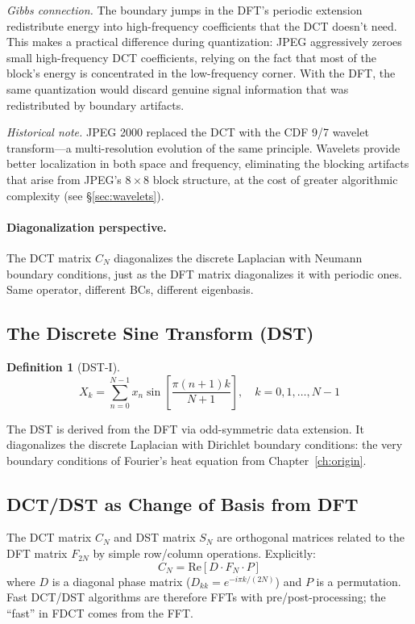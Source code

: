 \documentclass[12pt,a4paper]{report}
\theoremstyle{thms}
\theoremstyle{defns}
\newtheorem{definition}{Definition}[section]
\begin{document}
\textit{Gibbs connection.} The boundary jumps in the DFT's periodic extension redistribute energy into high-frequency coefficients that the DCT doesn't need. This makes a practical difference during quantization: JPEG aggressively zeroes small high-frequency DCT coefficients, relying on the fact that most of the block's energy is concentrated in the low-frequency corner. With the DFT, the same quantization would discard genuine signal information that was redistributed by boundary artifacts.

\textit{Historical note.} JPEG 2000 replaced the DCT with the CDF 9/7 wavelet transform—a multi-resolution evolution of the same principle. Wavelets provide better localization in both space and frequency, eliminating the blocking artifacts that arise from JPEG's $8 \times 8$ block structure, at the cost of greater algorithmic complexity (see \S\ref{sec:wavelets}).

\paragraph{Diagonalization perspective.} The DCT matrix $C_N$ diagonalizes the discrete Laplacian with Neumann boundary conditions, just as the DFT matrix diagonalizes it with periodic ones. Same operator, different BCs, different eigenbasis.

\subsection{The Discrete Sine Transform (DST)}

\begin{definition}[DST-I]
    \begin{equation}
        X_k = \sum_{n=0}^{N-1} x_n \sin\left[\dfrac{\pi(n+1)k}{N+1}\right], \quad k = 0, 1, \ldots, N-1
        \label{eq:dst}
    \end{equation}
\end{definition}

The DST is derived from the DFT via odd-symmetric data extension. It diagonalizes the discrete Laplacian with Dirichlet boundary conditions: the very boundary conditions of Fourier's heat equation from Chapter~\ref{ch:origin}.

\subsection{DCT/DST as Change of Basis from DFT}

The DCT matrix $C_N$ and DST matrix $S_N$ are orthogonal matrices related to the DFT matrix $F_{2N}$ by simple row/column operations. Explicitly:
\begin{equation}
    C_N = \mathrm{Re}[D \cdot F_N \cdot P]
\end{equation}
where $D$ is a diagonal phase matrix ($D_{kk} = e^{-i\pi k/(2N)}$) and $P$ is a permutation. Fast DCT/DST algorithms are therefore FFTs with pre/post-processing; the ``fast'' in FDCT comes from the FFT.
\end{document}
